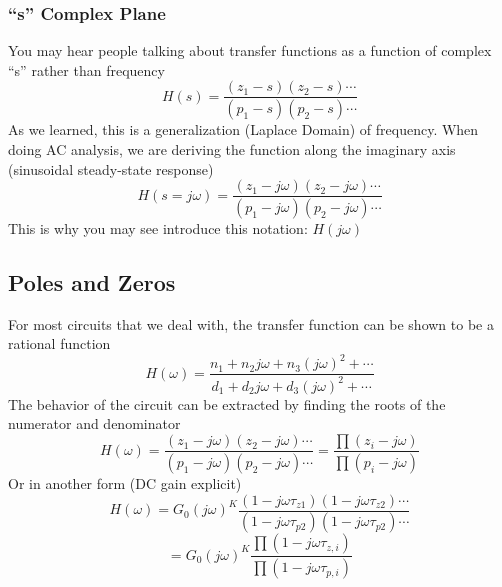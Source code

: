 
\subsubsection{“s” Complex Plane}

You may hear people talking about transfer functions as a function of complex “s” rather than frequency
\begin{equation}
	H(s) = \frac{{({z_1} - s)({z_2} - s) \cdots }}{{({p_1} - s)({p_2} - s) \cdots }}
\end{equation}
As we learned, this is a generalization (Laplace Domain) of frequency. When doing AC analysis, we are deriving the function along the imaginary axis (sinusoidal steady-state response)
\begin{equation}
	H(s = j\omega ) = \frac{{({z_1} - j\omega )({z_2} - j\omega ) \cdots }}{{({p_1} - j\omega )({p_2} - j\omega ) \cdots }}
\end{equation}
This is why you may see introduce this notation:  $H(j\omega )$

 

\subsection{Poles and Zeros}

For most circuits that we deal with, the transfer function can be shown to be a rational function
\begin{equation}
	H(\omega ) = \frac{{{n_1} + {n_2}j\omega  + {n_3}{{(j\omega )}^2} +  \cdots }}{{{d_1} + {d_2}j\omega  + {d_3}{{(j\omega )}^2} +  \cdots }}
\end{equation}
The behavior of the circuit can be extracted by finding the roots of the numerator and denominator
\begin{equation} 
	H(\omega ) = \frac{{({z_1} - j\omega )({z_2} - j\omega ) \cdots }}{{({p_1} - j\omega )({p_2} - j\omega ) \cdots }} = \frac{{\prod {({z_i} - j\omega )} }}{{\prod {({p_i} - j\omega )} }}
\end{equation}
Or in another form (DC gain explicit)
\begin{equation}
	H(\omega ) = {G_0}{(j\omega )^K}\frac{{(1 - j\omega {\tau _{z1}})(1 - j\omega {\tau _{z2}}) \cdots }}{{(1 - j\omega {\tau _{p2}})(1 - j\omega {\tau _{p2}}) \cdots }}
\end{equation}	
\begin{equation} = {G_0}{(j\omega )^K}\frac{{\prod {(1 - j\omega {\tau _{z,i}})} }}{{\prod {(1 - j\omega {\tau _{p,i}})} }}
\end{equation}


